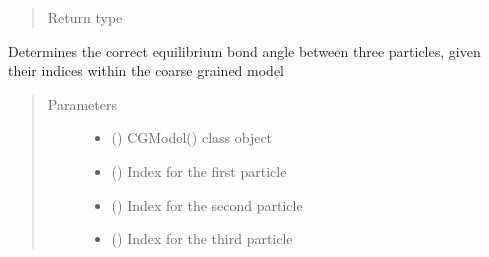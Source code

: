 \documentclass[letterpaper,12pt,english,openany,oneside]{sphinxmanual}
\begin{document}
\begin{fulllineitems}
\begin{fulllineitems}
\begin{quote}
\begin{description}
\item[{Return type}] \leavevmode



\end{description}\end{quote}

\end{fulllineitems}


\begin{fulllineitems}
\label{\detokenize{cg_model:cg_model.cgmodel.CGModel.get_equil_bond_angle}}
Determines the correct equilibrium bond angle between three particles, given their indices within the coarse grained model
\begin{quote}\begin{description}
\item[{Parameters}] \leavevmode\begin{itemize}
\item {} 
 () \textendash{} CGModel() class object

\item {} 
 () \textendash{} Index for the first particle

\item {} 
 () \textendash{} Index for the second particle

\item {} 
 () \textendash{} Index for the third particle

\end{itemize}


\end{description}
\end{quote}
\end{fulllineitems}
\end{fulllineitems}
\end{document}
